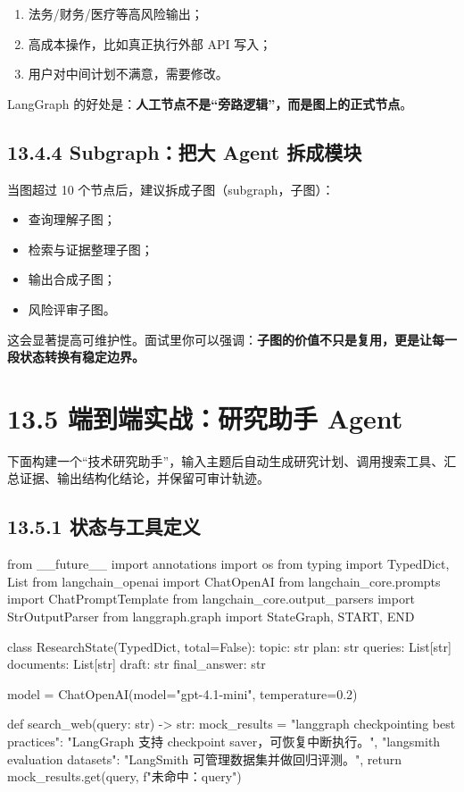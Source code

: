\begin{enumerate}[leftmargin=2em]
\item 法务/财务/医疗等高风险输出；
\item 高成本操作，比如真正执行外部 API 写入；
\item 用户对中间计划不满意，需要修改。
\end{enumerate}

LangGraph 的好处是：\textbf{人工节点不是``旁路逻辑''，而是图上的正式节点}。


\subsection{13.4.4 Subgraph：把大 Agent 拆成模块}

当图超过 10 个节点后，建议拆成子图（subgraph，子图）：


\begin{itemize}[leftmargin=2em]
\item 查询理解子图；
\item 检索与证据整理子图；
\item 输出合成子图；
\item 风险评审子图。
\end{itemize}

这会显著提高可维护性。面试里你可以强调：\textbf{子图的价值不只是复用，更是让每一段状态转换有稳定边界。}


\section{13.5 端到端实战：研究助手 Agent}

下面构建一个``技术研究助手''，输入主题后自动生成研究计划、调用搜索工具、汇总证据、输出结构化结论，并保留可审计轨迹。


\subsection{13.5.1 状态与工具定义}

\begin{codeblock}
from __future__ import annotations
import os
from typing import TypedDict, List
from langchain_openai import ChatOpenAI
from langchain_core.prompts import ChatPromptTemplate
from langchain_core.output_parsers import StrOutputParser
from langgraph.graph import StateGraph, START, END

class ResearchState(TypedDict, total=False):
    topic: str
    plan: str
    queries: List[str]
    documents: List[str]
    draft: str
    final_answer: str

model = ChatOpenAI(model="gpt-4.1-mini", temperature=0.2)

def search_web(query: str) -> str:
    mock_results = {
        "langgraph checkpointing best practices": "LangGraph 支持 checkpoint saver，可恢复中断执行。",
        "langsmith evaluation datasets": "LangSmith 可管理数据集并做回归评测。",
    }
    return mock_results.get(query, f"未命中：{query}")
\end{codeblock}

